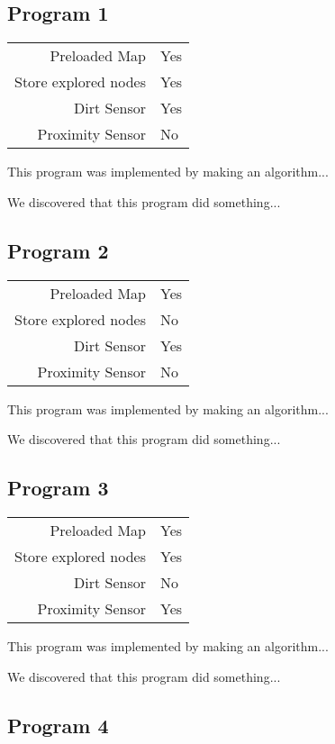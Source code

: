 \documentclass[letterpaper]{article}
\begin{document}
\subsection{Program 1}

\begin{tabular}{ r | l }  
	Preloaded Map			& Yes \\
	Store explored nodes	& Yes \\
	Dirt Sensor				& Yes \\
	Proximity Sensor		& No \\
\end{tabular}

This program was implemented by making an algorithm...

We discovered that this program did something...


\subsection{Program 2}

\begin{tabular}{ r | l }  
	Preloaded Map			& Yes \\
	Store explored nodes	& No \\
	Dirt Sensor				& Yes \\
	Proximity Sensor		& No \\
\end{tabular}

This program was implemented by making an algorithm...

We discovered that this program did something...

\subsection{Program 3}

\begin{tabular}{ r | l }  
	Preloaded Map			& Yes \\
	Store explored nodes	& Yes \\
	Dirt Sensor				& No \\
	Proximity Sensor		& Yes \\
\end{tabular}

This program was implemented by making an algorithm...

We discovered that this program did something...


\subsection{Program 4}
\end{document}
